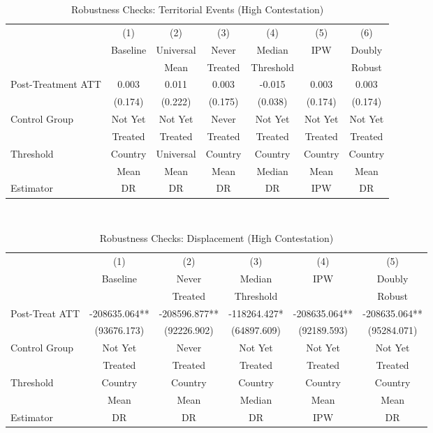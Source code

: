 \documentclass[bibtex]{article}
\begin{document}
{\begin{table}[H]
\centering
\caption{Robustness Checks:  Territorial Events  (High  Contestation)}
\label{tab:robust_ terr _ high }
\begin{tabular}{lcccccc}
\toprule
 & (1) & (2) & (3) & (4) & (5) & (6) \\
 & Baseline & Universal & Never & Median & IPW & Doubly \\
 &  & Mean & Treated & Threshold &  & Robust \\
\midrule
Post-Treatment ATT &  0.003  &  0.011  &  0.003  &  -0.015  &  0.003  &  0.003  \\
 &  (0.174)  &  (0.222)  &  (0.175)  &  (0.038)  &  (0.174)  &  (0.174)  \\
\midrule
Control Group & Not Yet & Not Yet & Never & Not Yet & Not Yet & Not Yet \\
 & Treated & Treated & Treated & Treated & Treated & Treated \\
Threshold & Country & Universal & Country & Country & Country & Country \\
 & Mean & Mean & Mean & Median & Mean & Mean \\
Estimator & DR & DR & DR & DR & IPW & DR \\
\bottomrule
\end{tabular}\\
\end{table}


\begin{table}[H]
\centering
\caption{Robustness Checks: Displacement (High Contestation)}
\label{tab:robust_idp_high}
\begin{tabular}{lccccc}
\toprule
 & (1) & (2) & (3) & (4) & (5) \\
 & Baseline & Never & Median & IPW & Doubly \\
 &  & Treated & Threshold &  & Robust \\
\midrule
Post-Treat ATT & -208635.064** & -208596.877** & -118264.427* & -208635.064** & -208635.064** \\
 & (93676.173) & (92226.902) & (64897.609) & (92189.593) & (95284.071) \\
\midrule
Control Group & Not Yet & Never & Not Yet & Not Yet & Not Yet \\
 & Treated & Treated & Treated & Treated & Treated \\
Threshold & Country & Country & Country & Country & Country \\
 & Mean & Mean & Median & Mean & Mean \\
Estimator & DR & DR & DR & IPW & DR \\
\bottomrule
\end{tabular}\\
\end{table}

}
\end{document}

